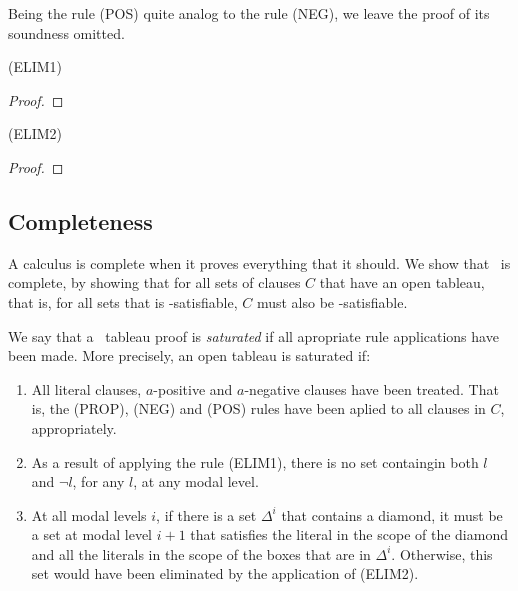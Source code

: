Being the rule (POS) quite analog to the rule (NEG), we leave the proof of its
soundness omitted.

\begin{lemma}{(ELIM1)}
    
\end{lemma}
\begin{proof}
    
\end{proof}

\begin{lemma}{(ELIM2)}
    
\end{lemma}
\begin{proof}
    
\end{proof}

\subsection{Completeness}
\label{sec:complete}

A calculus is complete when it proves everything that it should. We show that
\ckn~is complete, by showing that for all sets of clauses $C$ that have an open
tableau, that is, for all sets that is \ckn-satisfiable, $C$ must also be
-satisfiable.

\begin{definition}
\label{def:saturated} 
    We say that a \ckn~tableau proof is \emph{saturated} if all apropriate rule
    applications have been made. More precisely, an open tableau is saturated
    if:
    \begin{enumerate}
        \item All literal clauses, $a$-positive and $a$-negative clauses have
            been treated. That is, the (PROP), (NEG) and (POS) rules have been
            aplied to all clauses in $C$, appropriately.
        \item As a result of applying the rule (ELIM1), there is no set
            containgin both $l$ and $\neg l$, for any $l$, at any modal level.
        \item At all modal levels $i$, if there is a set $\Delta^i$ that contains a
            diamond, it must be a set at modal level $i+1$ that satisfies the
            literal in the scope of the diamond and all the literals in the
            scope of the boxes that are in $\Delta^i$. Otherwise, this set would
            have been eliminated by the application of (ELIM2).
    \end{enumerate}
\end{definition}

